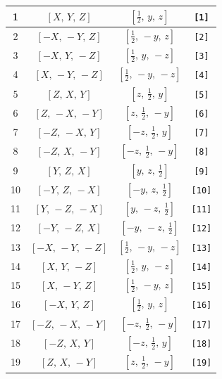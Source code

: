 \documentclass[fleqn,8pt]{jsarticle}
\begin{document}
\begin{longtable}{cccc}
1 & $\left[ X,\, Y,\, Z \right]$ & $\left[ \frac{1}{2},\, y,\, z \right]$ & {\tt [1]} \\ \hline
2 & $\left[ - X,\, - Y,\, Z \right]$ & $\left[ \frac{1}{2},\, - y,\, z \right]$ & {\tt [2]} \\ \hline
3 & $\left[ - X,\, Y,\, - Z \right]$ & $\left[ \frac{1}{2},\, y,\, - z \right]$ & {\tt [3]} \\ \hline
4 & $\left[ X,\, - Y,\, - Z \right]$ & $\left[ \frac{1}{2},\, - y,\, - z \right]$ & {\tt [4]} \\ \hline
5 & $\left[ Z,\, X,\, Y \right]$ & $\left[ z,\, \frac{1}{2},\, y \right]$ & {\tt [5]} \\ \hline
6 & $\left[ Z,\, - X,\, - Y \right]$ & $\left[ z,\, \frac{1}{2},\, - y \right]$ & {\tt [6]} \\ \hline
7 & $\left[ - Z,\, - X,\, Y \right]$ & $\left[ - z,\, \frac{1}{2},\, y \right]$ & {\tt [7]} \\ \hline
8 & $\left[ - Z,\, X,\, - Y \right]$ & $\left[ - z,\, \frac{1}{2},\, - y \right]$ & {\tt [8]} \\ \hline
9 & $\left[ Y,\, Z,\, X \right]$ & $\left[ y,\, z,\, \frac{1}{2} \right]$ & {\tt [9]} \\ \hline
10 & $\left[ - Y,\, Z,\, - X \right]$ & $\left[ - y,\, z,\, \frac{1}{2} \right]$ & {\tt [10]} \\ \hline
11 & $\left[ Y,\, - Z,\, - X \right]$ & $\left[ y,\, - z,\, \frac{1}{2} \right]$ & {\tt [11]} \\ \hline
12 & $\left[ - Y,\, - Z,\, X \right]$ & $\left[ - y,\, - z,\, \frac{1}{2} \right]$ & {\tt [12]} \\ \hline
13 & $\left[ - X,\, - Y,\, - Z \right]$ & $\left[ \frac{1}{2},\, - y,\, - z \right]$ & {\tt [13]} \\ \hline
14 & $\left[ X,\, Y,\, - Z \right]$ & $\left[ \frac{1}{2},\, y,\, - z \right]$ & {\tt [14]} \\ \hline
15 & $\left[ X,\, - Y,\, Z \right]$ & $\left[ \frac{1}{2},\, - y,\, z \right]$ & {\tt [15]} \\ \hline
16 & $\left[ - X,\, Y,\, Z \right]$ & $\left[ \frac{1}{2},\, y,\, z \right]$ & {\tt [16]} \\ \hline
17 & $\left[ - Z,\, - X,\, - Y \right]$ & $\left[ - z,\, \frac{1}{2},\, - y \right]$ & {\tt [17]} \\ \hline
18 & $\left[ - Z,\, X,\, Y \right]$ & $\left[ - z,\, \frac{1}{2},\, y \right]$ & {\tt [18]} \\ \hline
19 & $\left[ Z,\, X,\, - Y \right]$ & $\left[ z,\, \frac{1}{2},\, - y \right]$ & {\tt [19]} \\ \hline

\end{longtable}
\end{document}
